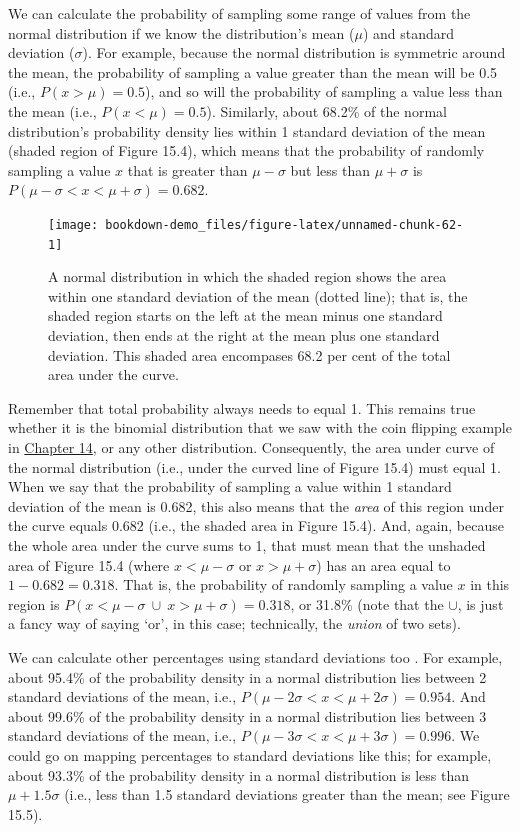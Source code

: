 \documentclass[
]{scrbook}
\begin{document}
We can calculate the probability of sampling some range of values from the normal distribution if we know the distribution's mean (\(\mu\)) and standard deviation (\(\sigma\)).
For example, because the normal distribution is symmetric around the mean, the probability of sampling a value greater than the mean will be 0.5 (i.e., \(P(x > \mu) = 0.5\)), and so will the probability of sampling a value less than the mean (i.e., \(P(x < \mu) = 0.5\)).
Similarly, about 68.2\% of the normal distribution's probability density lies within 1 standard deviation of the mean (shaded region of Figure 15.4), which means that the probability of randomly sampling a value \(x\) that is greater than \(\mu - \sigma\) but less than \(\mu + \sigma\) is \(P(\mu - \sigma < x < \mu + \sigma) = 0.682\).

\begin{figure}
\texttt{[image: bookdown-demo\_files/figure-latex/unnamed-chunk-62-1]} \caption{A normal distribution in which the shaded region shows the area within one standard deviation of the mean (dotted line); that is, the shaded region starts on the left at the mean minus one standard deviation, then ends at the right at the mean plus one standard deviation. This shaded area encompases 68.2 per cent of the total area under the curve.}\label{fig:unnamed-chunk-62}
\end{figure}

Remember that total probability always needs to equal 1.
This remains true whether it is the binomial distribution that we saw with the coin flipping example in \protect\hyperlink{Chapter_14}{Chapter 14}, or any other distribution.
Consequently, the area under curve of the normal distribution (i.e., under the curved line of Figure 15.4) must equal 1.
When we say that the probability of sampling a value within 1 standard deviation of the mean is 0.682, this also means that the \emph{area} of this region under the curve equals 0.682 (i.e., the shaded area in Figure 15.4).
And, again, because the whole area under the curve sums to 1, that must mean that the unshaded area of Figure 15.4 (where \(x < \mu -\sigma\) or \(x > \mu + \sigma\)) has an area equal to \(1 - 0.682 = 0.318\).
That is, the probability of randomly sampling a value \(x\) in this region is \(P(x < \mu - \sigma \: \cup \: x > \mu + \sigma) = 0.318\), or 31.8\% (note that the \(\cup\), is just a fancy way of saying `or', in this case; technically, the \emph{union} of two sets).

We can calculate other percentages using standard deviations too \citep{Sokal1995}.
For example, about 95.4\% of the probability density in a normal distribution lies between 2 standard deviations of the mean, i.e., \(P(\mu - 2\sigma < x < \mu + 2\sigma) = 0.954\).
And about 99.6\% of the probability density in a normal distribution lies between 3 standard deviations of the mean, i.e., \(P(\mu - 3\sigma < x < \mu + 3\sigma) = 0.996\).
We could go on mapping percentages to standard deviations like this; for example, about 93.3\% of the probability density in a normal distribution is less than \(\mu + 1.5\sigma\) (i.e., less than 1.5 standard deviations greater than the mean; see Figure 15.5).
\end{document}
